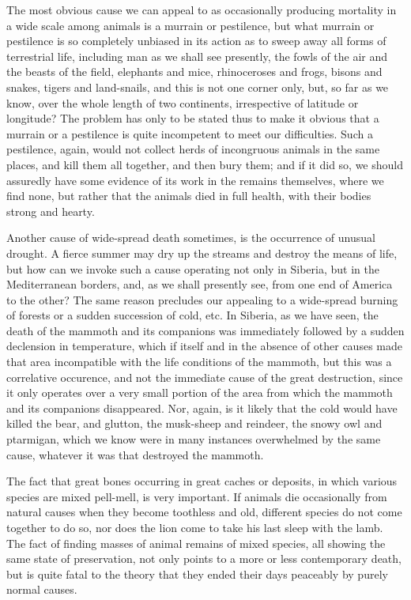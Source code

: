 The most obvious cause we can appeal to as occasionally producing mortality in a wide scale
among animals is a murrain or pestilence, but what murrain or pestilence is so completely
unbiased in its action as to sweep away all forms of terrestrial life, including man as we shall
see presently, the fowls of the air and the beasts of the field, elephants and mice, rhinoceroses
and frogs, bisons and snakes, tigers and land-snails, and this is not one corner only, but, so
far as we know, over the whole length of two continents, irrespective of latitude or
longitude? The problem has only to be stated thus to make it obvious that a murrain or a
pestilence is quite incompetent to meet our difficulties. Such a pestilence, again, would not
collect herds of incongruous animals in the same places, and kill them all together, and then
bury them; and if it did so, we should assuredly have some evidence of its work in the
remains themselves, where we find none, but rather that the animals died in full health, with
their bodies strong and hearty.

Another cause of wide-spread death sometimes, is the occurrence of unusual drought. A
fierce summer may dry up the streams and destroy the means of life, but how can we invoke
such a cause operating not only in Siberia, but in the Mediterranean borders, and, as we shall
presently see, from one end of America to the other? The same reason precludes our
appealing to a wide-spread burning of forests or a sudden succession of cold, etc. In Siberia,
as we have seen, the death of the mammoth and its companions was immediately followed by
a sudden declension in temperature, which if itself and in the absence of other causes made
that area incompatible with the life conditions of the mammoth, but this was a correlative
occurence, and not the immediate cause of the great destruction, since it only operates over a
very small portion of the area from which the mammoth and its companions disappeared.
Nor, again, is it likely that the cold would have killed the bear, and glutton, the musk-sheep
and reindeer, the snowy owl and ptarmigan, which we know were in many instances
overwhelmed by the same cause, whatever it was that destroyed the mammoth.

The fact that great bones occurring in great caches or deposits, in which various species are
mixed pell-mell, is very important. If animals die occasionally from natural causes when they
become toothless and old, different species do not come together to do so, nor does the lion
come to take his last sleep with the lamb. The fact of finding masses of animal remains of
mixed species, all showing the same state of preservation, not only points to a more or less
contemporary death, but is quite fatal to the theory that they ended their days peaceably by
purely normal causes.

